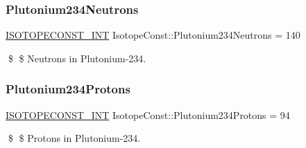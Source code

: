\subsubsection{\texorpdfstring{Plutonium234\+Neutrons}{Plutonium234Neutrons}}
{\footnotesize\ttfamily \mbox{\hyperlink{group___isotope_const-_macros_ga5f18360b3e99483a35c32d789e62621c}{I\+S\+O\+T\+O\+P\+E\+C\+O\+N\+S\+T\+\_\+\+I\+NT}} Isotope\+Const\+::\+Plutonium234\+Neutrons = 140}

\$ \$ Neutrons in Plutonium-\/234. \mbox{\label{group___isotope_const-_plutonium-_pu234_ga4eff41039c6f70f51f7a8a9a2a5fd4fe}} 
\subsubsection{\texorpdfstring{Plutonium234\+Protons}{Plutonium234Protons}}
{\footnotesize\ttfamily \mbox{\hyperlink{group___isotope_const-_macros_ga5f18360b3e99483a35c32d789e62621c}{I\+S\+O\+T\+O\+P\+E\+C\+O\+N\+S\+T\+\_\+\+I\+NT}} Isotope\+Const\+::\+Plutonium234\+Protons = 94}

\$ \$ Protons in Plutonium-\/234. 